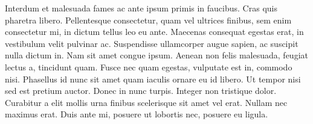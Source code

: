 Interdum et malesuada fames ac ante ipsum primis in faucibus. Cras quis pharetra libero. Pellentesque consectetur, quam vel ultrices finibus, sem enim consectetur mi, in dictum tellus leo eu ante. Maecenas consequat egestas erat, in vestibulum velit pulvinar ac. Suspendisse ullamcorper augue sapien, ac suscipit nulla dictum in. Nam sit amet congue ipsum. Aenean non felis malesuada, feugiat lectus a, tincidunt quam. Fusce nec quam egestas, vulputate est in, commodo nisi. Phasellus id nunc sit amet quam iaculis ornare eu id libero. Ut tempor nisi sed est pretium auctor. Donec in nunc turpis. Integer non tristique dolor. Curabitur a elit mollis urna finibus scelerisque sit amet vel erat. Nullam nec maximus erat. Duis ante mi, posuere ut lobortis nec, posuere eu ligula.

